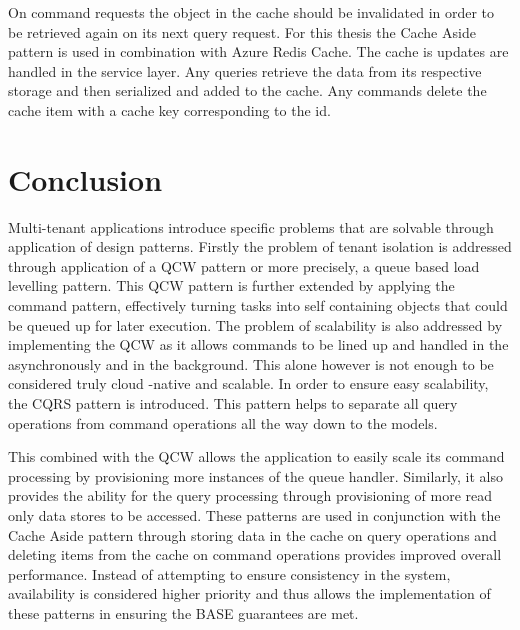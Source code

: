 On command requests the object in the cache should be invalidated in order to be retrieved again on its next query request. For this thesis the Cache Aside pattern is used in combination with Azure Redis Cache. The cache is updates are handled in the service layer. Any queries retrieve the data from its respective storage and then serialized and added to the cache. Any commands delete the cache item with a cache key corresponding to the id.


 \section{Conclusion}
 
 Multi-tenant applications introduce specific problems that are solvable through application of design patterns. Firstly the problem of tenant isolation is addressed through application of a QCW pattern or more precisely, a queue based load levelling pattern. This QCW pattern is further extended by applying the command pattern, effectively turning tasks into self containing objects that could be queued up for later execution. The problem of scalability is also addressed by implementing the QCW as it allows commands to be lined up and handled in the asynchronously and in the background. This alone however is not enough to be considered truly cloud -native and scalable. In order to ensure easy scalability, the CQRS pattern is introduced. This pattern helps to separate all query operations from command operations all the way down to the models.
 
This combined with the QCW allows the application to easily scale its command processing by provisioning more instances of the queue handler. Similarly, it also provides the ability for the query processing through provisioning of more read only data stores to be accessed. These patterns are used in conjunction with the Cache Aside pattern through storing data in the cache on query operations and deleting items from the cache on command operations provides improved overall performance. Instead of attempting to ensure consistency in the system, availability is considered higher priority and thus allows the implementation of these patterns in ensuring the BASE guarantees are met.